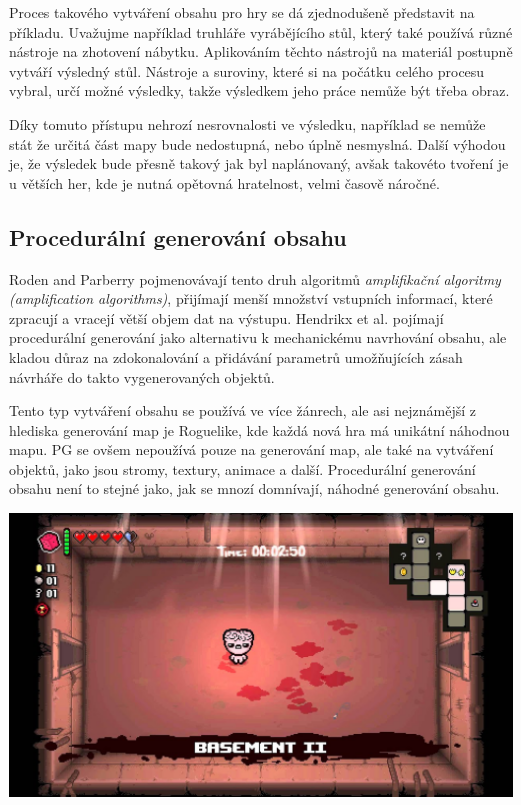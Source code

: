 Proces takového vytváření obsahu pro hry se dá zjednodušeně představit na příkladu. Uvažujme například truhláře vyrábějícího stůl, který také používá různé nástroje na zhotovení nábytku. Aplikováním těchto nástrojů na materiál postupně vytváří výsledný stůl. Nástroje a suroviny, které si na počátku celého procesu vybral, určí možné výsledky, takže výsledkem jeho práce nemůže být třeba obraz.

Díky tomuto přístupu nehrozí nesrovnalosti ve výsledku, například se nemůže stát že určitá část mapy bude nedostupná, nebo úplně nesmyslná. Další výhodou je, že výsledek bude přesně takový jak byl naplánovaný, avšak takovéto tvoření je u větších her, kde je nutná opětovná hratelnost, velmi časově náročné.

\subsection{Procedurální generování obsahu}
\label{procedural}
Roden and Parberry \cite{FromArtistry} pojmenovávají tento druh algoritmů \textit{amplifikační algoritmy (amplification algorithms)}, přijímají menší množství vstupních informací, které zpracují a vracejí větší objem dat na výstupu. Hendrikx et al. \cite{Hendrikx} pojímají procedurální generování jako alternativu k mechanickému navrhování obsahu, ale kladou důraz na zdokonalování a přidávání parametrů umožňujících zásah návrháře do takto vygenerovaných objektů.

Tento typ vytváření obsahu se používá ve více žánrech, ale asi nejznámější z hlediska generování map je Roguelike, kde každá nová hra má unikátní náhodnou mapu. PG se ovšem nepoužívá pouze na generování map, ale také na vytváření objektů, jako jsou stromy, textury, animace a další. Procedurální generování obsahu není to stejné jako, jak se mnozí domnívají, náhodné generování obsahu.

\includegraphics[scale=0.3]{obrazky-figures/BindingOfIsaac.jpg}

